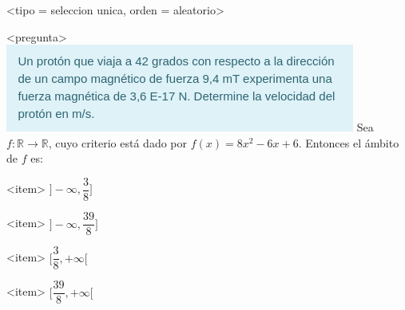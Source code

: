 <tipo = seleccion unica, orden = aleatorio>

<pregunta>
\includegraphics{preg1.png}
Sea $f:\mathbb R \to \mathbb R$, cuyo criterio est\'a dado por $f(x) = 8x^2 -6x +6$. Entonces el \'ambito de $f$ es:


<item>
$\bigg]{-}\infty, \dfrac{3}{8}\bigg]$

<item>
$\bigg]{-}\infty, \dfrac{39}{8}\bigg]$

<item>
$\bigg[\dfrac{3}{8}, +\infty\bigg[$

<item>
$\bigg[\dfrac{39}{8}, +\infty\bigg[$



